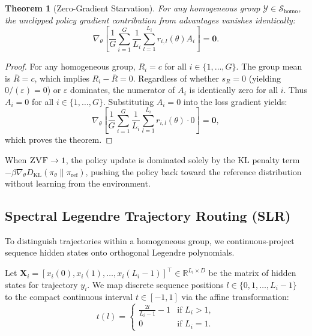 \documentclass{article}
\newtheorem{theorem}{Theorem}
\newcommand{\zvf}{\textsc{ZVF}\xspace}
\newcommand{\slr}{\textsc{SLR}\xspace}
\begin{document}
\begin{theorem}[Zero-Gradient Starvation]
\label{thm:zero_gradient}
For any homogeneous group $\mathcal{Y} \in \mathcal{S}_{\text{homo}}$, the unclipped policy gradient contribution from advantages vanishes identically:
\begin{equation}
  \nabla_\theta \left[ \frac{1}{G} \sum_{i=1}^G \frac{1}{L_i} \sum_{l=1}^{L_i} r_{i,l}(\theta) A_i \right] = \mathbf{0}.
\end{equation}
\end{theorem}

\begin{proof}
For any homogeneous group, $R_i = c$ for all $i \in \{1, \dots, G\}$. The group mean is $\bar{R} = c$, which implies $R_i - \bar{R} = 0$. Regardless of whether $s_R = 0$ (yielding $0/(\varepsilon) = 0$) or $\varepsilon$ dominates, the numerator of $A_i$ is identically zero for all $i$. Thus $A_i = 0$ for all $i \in \{1, \dots, G\}$. Substituting $A_i = 0$ into the loss gradient yields:
\begin{equation}
  \nabla_\theta \left[ \frac{1}{G} \sum_{i=1}^G \frac{1}{L_i} \sum_{l=1}^{L_i} r_{i,l}(\theta) \cdot 0 \right] = \mathbf{0},
\end{equation}
which proves the theorem.
\end{proof}

When $\text{\zvf} \to 1$, the policy update is dominated solely by the KL penalty term $-\beta \nabla_\theta D_{\text{KL}}(\pi_\theta \| \pi_{\text{ref}})$, pushing the policy back toward the reference distribution without learning from the environment.

\subsection{Spectral Legendre Trajectory Routing (\slr)}
\label{subsec:slr_formulation}

To distinguish trajectories within a homogeneous group, we continuous-project sequence hidden states onto orthogonal Legendre polynomials.

Let $\mathbf{X}_i = [x_i(0), x_i(1), \dots, x_i(L_i-1)]^\top \in \mathbb{R}^{L_i \times D}$ be the matrix of hidden states for trajectory $y_i$. We map discrete sequence positions $l \in \{0, 1, \dots, L_i - 1\}$ to the compact continuous interval $t \in [-1, 1]$ via the affine transformation:
\begin{equation}
  t(l) = \begin{cases} \frac{2l}{L_i - 1} - 1 & \text{if } L_i > 1, \\ 0 & \text{if } L_i = 1. \end{cases}
  \label{eq:legendre_grid}
\end{equation}
\end{document}

